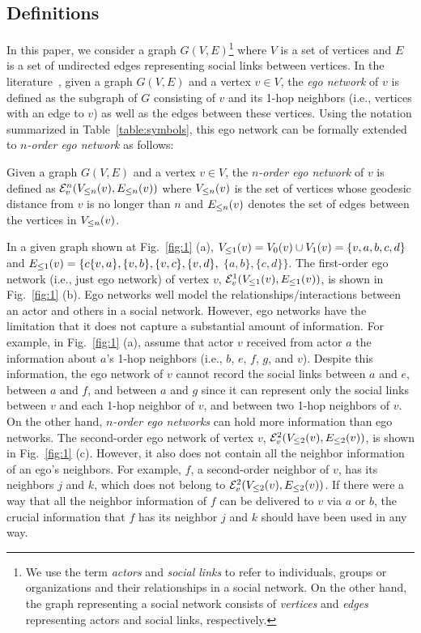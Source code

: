 \subsection{Definitions}\label{subsec:x-egoDefinition}
In this paper, we consider a graph $G(V, E)$\footnote{We use the term {\em actors} and {\em social links} to refer to individuals, groups or organizations and their relationships in a social network. On the other hand, the graph representing a social network consists of {\em vertices} and {\em edges} representing actors and social links, respectively.} where $V$ is a set of vertices and $E$ is a set of undirected edges representing social links between vertices.
In the literature~\cite{egocentric, everett, ICCN:lbcdna, SIMBET}, given a graph $G(V, E)$ and a vertex $v \in V$, the {\em ego network} of $v$ is defined as the subgraph of $G$ consisting of $v$ and its 1-hop neighbors (i.e., vertices with an edge to $v$) as well as the edges between these vertices.
Using the notation summarized in Table~\ref{table:symbols}, this ego network can be formally extended to \emph{$n$-order ego network} as follows:

\begin{definition}\label{def:multi-order-ego-network}
Given a graph $G(V, E)$ and a vertex $v \in V$, the \emph{$n$-order ego network} of $v$ is defined as $\ENN{v}{n} (\LV{v}{n}, \LE{v}{n})$ where $\LV{v}{n}$ is the set of vertices whose geodesic distance from $v$ is no longer than $n$ and $\LE{v}{n}$ denotes the set of edges between the vertices in $\LV{v}{n}$.
\end{definition}

In a given graph shown at Fig.~\ref{fig:1} (a), $\LV{v}{1} = \V{v}{0} \cup \V{v}{1} = \{v, a, b, c, d\}$ and $\LE{v}{1}=\{c\{v, a\}, \{v, b\}, \{v, c\}, \{v, d\},$ $\{a, b\}, \{c, d\} \}$.
The first-order ego network (i.e., just ego network) of vertex $v$, $\ENN{v}{1}(\LV{v}{1}, \LE{v}{1})$, is shown in Fig.~\ref{fig:1} (b).
Ego networks well model the relationships/interactions between an actor and others in a social network.
However, ego networks have the limitation that it does not capture a substantial amount of information.
For example, in Fig.~\ref{fig:1} (a), assume that actor $v$ received from actor $a$ the information about $a$'s 1-hop neighbors (i.e., $b$, $e$, $f$, $g$, and $v$).
Despite this information, the ego network of $v$ cannot record the social links between $a$ and $e$, between $a$ and $f$, and between $a$ and $g$ since it can represent only the social links between $v$ and each 1-hop neighbor of $v$, and between two 1-hop neighbors of $v$.
On the other hand, \emph{$n$-order ego networks} can hold more information than ego networks.
The second-order ego network of vertex $v$, $\ENN{v}{2} (\LV{v}{2}, \LE{v}{2})$, is shown in Fig.~\ref{fig:1} (c).
However, it also does not contain all the neighbor information of an ego's neighbors.
For example, $f$, a second-order neighbor of $v$, has its neighbors $j$ and $k$, which does not belong to $\ENN{v}{2} (\LV{v}{2}, \LE{v}{2})$. If there were a way that all the neighbor information of $f$ can be delivered to $v$ via $a$ or $b$, the crucial information that $f$ has its neighbor $j$ and $k$ should have been used in any way. 

